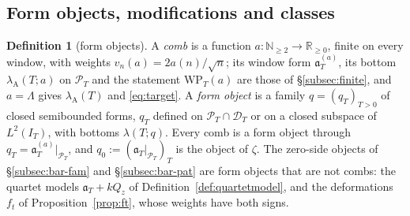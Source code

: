 \documentclass[11pt]{amsart}
\theoremstyle{definition}
\newtheorem{definition}[theorem]{Definition}
\theoremstyle{remark}
\newcommand{\R}{\mathbb R}
\newcommand{\N}{\mathbb N}
\newcommand{\PT}{\mathcal P_T}
\newcommand{\IT}{I_T}
\newcommand{\lamA}{\lambda_{\mathrm A}(T)}
\begin{document}
\subsection{Form objects, modifications and classes}

\begin{definition}[form objects]\label{def:shape-obj}
A \emph{comb} is a function $a:\N_{\ge2}\to\R_{\ge0}$, finite on every window, with weights $v_n(a)=2a(n)/\sqrt n$; its window
form $\mathfrak a^{(a)}_T$, its bottom $\lambda_{\mathrm A}(T;a)$ on $\PT$ and the statement $\mathrm{WP}_T(a)$ are those of
\S\ref{subsec:finite}, and $a=\Lambda$ gives $\lamA$ and \eqref{eq:target}. A \emph{form object} is a family $q=(q_T)_{T>0}$ of
closed semibounded forms, $q_T$ defined on $\PT\cap\mathcal D_T$ or on a closed subspace of $L^2(\IT)$, with bottoms
$\lambda(T;q)$. Every comb is a form object through $q_T=\mathfrak a^{(a)}_T|_{\PT}$, and $q_0:=(\mathfrak a_T|_{\PT})_T$ is the
object of $\zeta$. The zero-side objects of \S\ref{subsec:bar-fam} and \S\ref{subsec:bar-pat} are form objects that are not combs:
the quartet models $\mathfrak a_T+kQ_z$ of Definition~\ref{def:quartetmodel}, and the deformations $f_t$ of
Proposition~\ref{prop:ft}, whose weights have both signs.
\end{definition}
\end{document}
